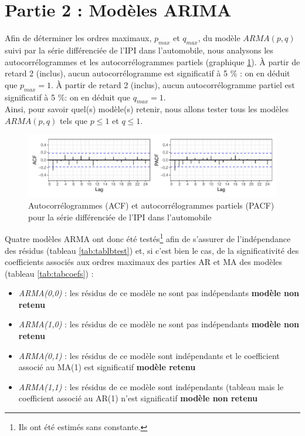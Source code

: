\documentclass[,french]{article}
\let\rmarkdownfootnote\footnote%
\def\footnote{\protect\rmarkdownfootnote}
\begin{document}
\hypertarget{partie-2-moduxe8les-arima}{%
\section{Partie 2 : Modèles ARIMA}\label{partie-2-moduxe8les-arima}}

Afin de déterminer les ordres maximaux, \(p_{max}\) et \(q_{max}\), du modèle \(ARMA(p,q)\) suivi par la série différenciée de l'IPI dans l'automobile, nous analysons les autocorrélogrammes et les autocorrélogrammes partiels (graphique \ref{fig:acfPacf}).
À partir de retard 2 (inclus), aucun autocorrélogramme est significatif à 5 \% : on en déduit que \(p_{max} = 1\).
À partir de retard 2 (inclus), aucun autocorrélogramme partiel est significatif à 5 \%: on en déduit que \(q_{max} = 1\).\\
Ainsi, pour savoir quel(s) modèle(s) retenir, nous allons tester tous les modèles \(ARMA(p,q)\) tels que \(p\leq 1\) et \(q\leq 1\).

\begin{figure}

{\centering \includegraphics{img/rmd-acfPacf-1} 

}

\caption{Autocorrélogrammes (ACF) et autocorrélogrammes partiels (PACF) pour la série différenciée de l'IPI dans l'automobile}\label{fig:acfPacf}
\end{figure}

Quatre modèles ARMA ont donc été testés\footnote{Ils ont été estimés sans constante.} afin de s'assurer de l'indépendance des résidus (tableau \ref{tab:tablbtest}) et, si c'est bien le cas, de la significativité des coefficients associés aux ordres maximaux des parties AR et MA des modèles (tableau \ref{tab:tabcoefs}) :

\begin{itemize}
\item \emph{ARMA(0,0)} : les résidus de ce modèle ne sont pas indépendants \faArrowCircleRight{} \textbf{modèle non retenu}

\item \emph{ARMA(1,0)} : les résidus de ce modèle ne sont pas indépendants \faArrowCircleRight{} \textbf{modèle non retenu}

\item \emph{ARMA(0,1)} : les résidus de ce modèle sont indépendants et le coefficient associé au MA(1) est significatif \faArrowCircleRight{} \textbf{modèle retenu}

\item \emph{ARMA(1,1)} : les résidus de ce modèle sont indépendants (tableau mais le coefficient associé au AR(1) n'est significatif \faArrowCircleRight{} \textbf{modèle non retenu}
\end{itemize}
\end{document}
